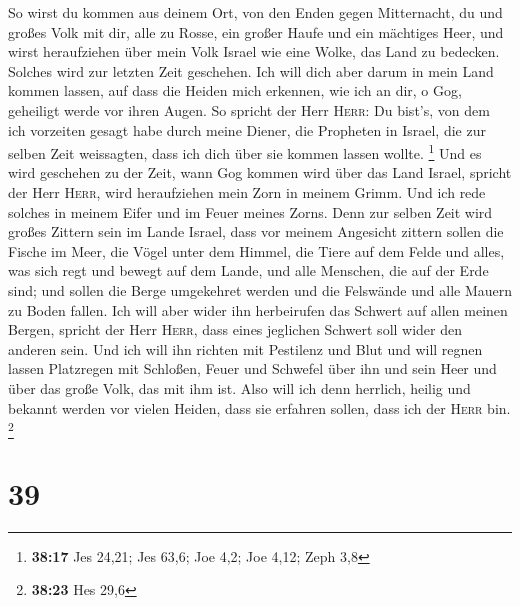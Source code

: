 So wirst du kommen aus deinem Ort, von den Enden gegen Mitternacht, du
und großes Volk mit dir, alle zu Rosse, ein großer Haufe und ein
mächtiges Heer,  und wirst heraufziehen über mein Volk
Israel wie eine Wolke, das Land zu bedecken. Solches wird zur letzten
Zeit geschehen. Ich will dich aber darum in mein Land kommen lassen, auf
dass die Heiden mich erkennen, wie ich an dir, o Gog, geheiligt werde
vor ihren Augen.  So spricht der Herr \textsc{Herr}: Du
bist's, von dem ich vorzeiten gesagt habe durch meine Diener, die
Propheten in Israel, die zur selben Zeit weissagten, dass ich dich über
sie kommen lassen wollte. \footnote{\textbf{38:17} Jes 24,21; Jes 63,6;
  Joe 4,2; Joe 4,12; Zeph 3,8}  Und es wird geschehen zu
der Zeit, wann Gog kommen wird über das Land Israel, spricht der Herr
\textsc{Herr}, wird heraufziehen mein Zorn in meinem Grimm.
 Und ich rede solches in meinem Eifer und im Feuer meines
Zorns. Denn zur selben Zeit wird großes Zittern sein im Lande Israel,
 dass vor meinem Angesicht zittern sollen die Fische im
Meer, die Vögel unter dem Himmel, die Tiere auf dem Felde und alles, was
sich regt und bewegt auf dem Lande, und alle Menschen, die auf der Erde
sind; und sollen die Berge umgekehret werden und die Felswände und alle
Mauern zu Boden fallen.  Ich will aber wider ihn
herbeirufen das Schwert auf allen meinen Bergen, spricht der Herr
\textsc{Herr}, dass eines jeglichen Schwert soll wider den anderen sein.
 Und ich will ihn richten mit Pestilenz und Blut und will
regnen lassen Platzregen mit Schloßen, Feuer und Schwefel über ihn und
sein Heer und über das große Volk, das mit ihm ist.  Also
will ich denn herrlich, heilig und bekannt werden vor vielen Heiden,
dass sie erfahren sollen, dass ich der \textsc{Herr} bin. \footnote{\textbf{38:23}
  Hes 29,6}

\hypertarget{section-12}{%
\section{39}\label{section-12}}

